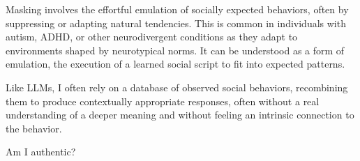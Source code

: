 Masking involves the effortful emulation of socially expected behaviors, often by suppressing or adapting natural tendencies. This is common in individuals with autism, ADHD, or other neurodivergent conditions as they adapt to environments shaped by neurotypical norms. It can be understood as a form of emulation, the execution of a learned social script to fit into expected patterns.

Like LLMs, I often rely on a database of observed social behaviors, recombining them to produce contextually appropriate responses, often without a real understanding of a deeper meaning and without feeling an intrinsic connection to the behavior.

Am I authentic?